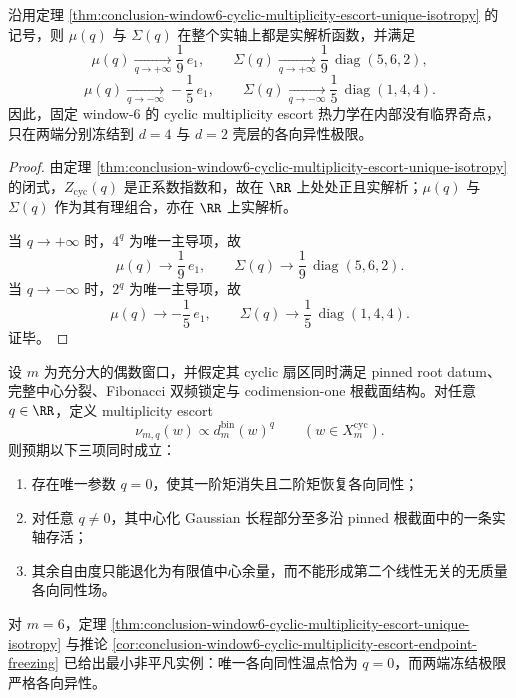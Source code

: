 \begin{corollary}\label{cor:conclusion-window6-cyclic-multiplicity-escort-endpoint-freezing}
沿用定理 \ref{thm:conclusion-window6-cyclic-multiplicity-escort-unique-isotropy} 的记号，则 \(\mu(q)\) 与 \(\Sigma(q)\) 在整个实轴上都是实解析函数，并满足
\[
\mu(q)\xrightarrow[q\to+\infty]{}\frac19\,e_1,
\qquad
\Sigma(q)\xrightarrow[q\to+\infty]{}\frac19\,\operatorname{diag}(5,6,2),
\]
\[
\mu(q)\xrightarrow[q\to-\infty]{}-\frac15\,e_1,
\qquad
\Sigma(q)\xrightarrow[q\to-\infty]{}\frac15\,\operatorname{diag}(1,4,4).
\]
因此，固定 window-\(6\) 的 cyclic multiplicity escort 热力学在内部没有临界奇点，只在两端分别冻结到 \(d=4\) 与 \(d=2\) 壳层的各向异性极限。
\end{corollary}

\begin{proof}
由定理 \ref{thm:conclusion-window6-cyclic-multiplicity-escort-unique-isotropy} 的闭式，\(Z_{\mathrm{cyc}}(q)\) 是正系数指数和，故在 \(\RR\) 上处处正且实解析；\(\mu(q)\) 与 \(\Sigma(q)\) 作为其有理组合，亦在 \(\RR\) 上实解析。

当 \(q\to+\infty\) 时，\(4^q\) 为唯一主导项，故
\[
\mu(q)\longrightarrow \frac19\,e_1,
\qquad
\Sigma(q)\longrightarrow \frac19\,\operatorname{diag}(5,6,2).
\]
当 \(q\to-\infty\) 时，\(2^q\) 为唯一主导项，故
\[
\mu(q)\longrightarrow -\frac15\,e_1,
\qquad
\Sigma(q)\longrightarrow \frac15\,\operatorname{diag}(1,4,4).
\]
证毕。
\end{proof}

\begin{conjecture}\label{conj:conclusion-window6-evenwindow-cyclic-escort-unique-isotropy}
设 \(m\) 为充分大的偶数窗口，并假定其 cyclic 扇区同时满足 pinned root datum、完整中心分裂、Fibonacci 双频锁定与 codimension-one 根截面结构。对任意 \(q\in\RR\)，定义 multiplicity escort
\[
\nu_{m,q}(w)\propto d_m^{\mathrm{bin}}(w)^q
\qquad
(w\in X_m^{\mathrm{cyc}}).
\]
则预期以下三项同时成立：
\begin{enumerate}
  \item 存在唯一参数 \(q=0\)，使其一阶矩消失且二阶矩恢复各向同性；
  \item 对任意 \(q\neq 0\)，其中心化 Gaussian 长程部分至多沿 pinned 根截面中的一条实轴存活；
  \item 其余自由度只能退化为有限值中心余量，而不能形成第二个线性无关的无质量各向同性场。
\end{enumerate}
对 \(m=6\)，定理 \ref{thm:conclusion-window6-cyclic-multiplicity-escort-unique-isotropy} 与推论 \ref{cor:conclusion-window6-cyclic-multiplicity-escort-endpoint-freezing} 已给出最小非平凡实例：唯一各向同性温点恰为 \(q=0\)，而两端冻结极限严格各向异性。
\end{conjecture}

